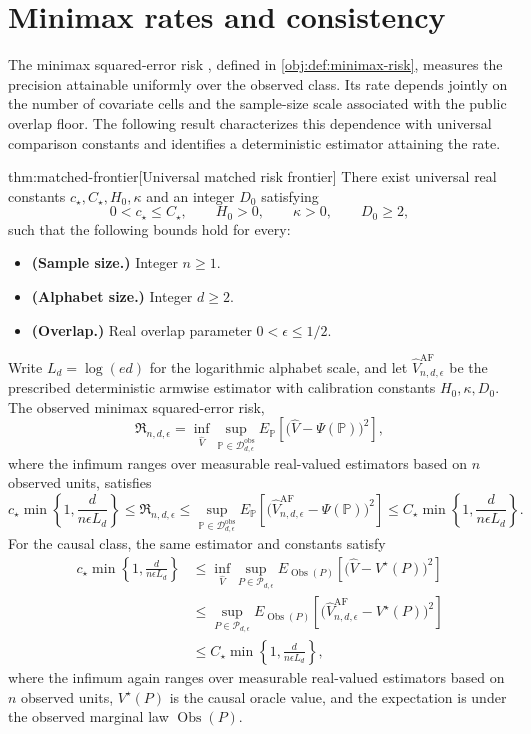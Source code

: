 \documentclass[11pt]{article}
\begin{document}
\section{Minimax rates and consistency}

The minimax squared-error risk , defined in \cref{obj:def:minimax-risk}, measures the precision attainable uniformly over the observed class. Its rate depends jointly on the number of covariate cells and the sample-size scale associated with the public overlap floor. The following result characterizes this dependence with universal comparison constants and identifies a deterministic estimator attaining the rate.

\begin{theoremv}{thm:matched-frontier}[Universal matched risk frontier]
There exist universal real constants \(c_\star,C_\star,H_0,\kappa\) and an integer \(D_0\) satisfying
\[
0<c_\star\le C_\star,\qquad H_0>0,\qquad \kappa>0,\qquad D_0\ge2,
\]
such that the following bounds hold for every:
\begin{itemize}
\item \textbf{(Sample size.)} Integer \(n\ge1\).
\item \textbf{(Alphabet size.)} Integer \(d\ge2\).
\item \textbf{(Overlap.)} Real overlap parameter \(0<\epsilon\le1/2\).
\end{itemize}
Write \(L_d=\log(ed)\) for the logarithmic alphabet scale, and let
\(\widehat V_{n,d,\epsilon}^{\mathrm{AF}}\) be the prescribed deterministic armwise estimator with calibration constants \(H_0,\kappa,D_0\). The observed minimax squared-error risk,
\[
\mathfrak R_{n,d,\epsilon}
=
\inf_{\widehat V}
\sup_{\mathbb P\in\mathcal D_{d,\epsilon}^{\mathrm{obs}}}
E_{\mathbb P}\!\left[
\bigl(\widehat V-\Psi(\mathbb P)\bigr)^2
\right],
\]
where the infimum ranges over measurable real-valued estimators based on \(n\) observed units, satisfies
\[
c_\star\min\left\{1,\frac{d}{n\epsilon L_d}\right\}
\le
\mathfrak R_{n,d,\epsilon}
\le
\sup_{\mathbb P\in\mathcal D_{d,\epsilon}^{\mathrm{obs}}}
E_{\mathbb P}\!\left[
\bigl(\widehat V_{n,d,\epsilon}^{\mathrm{AF}}-\Psi(\mathbb P)\bigr)^2
\right]
\le
C_\star\min\left\{1,\frac{d}{n\epsilon L_d}\right\}.
\]
For the causal class, the same estimator and constants satisfy
\[
\begin{aligned}
c_\star\min\left\{1,\frac{d}{n\epsilon L_d}\right\}
&\le
\inf_{\widehat V}
\sup_{P\in\mathcal P_{d,\epsilon}}
E_{\operatorname{Obs}(P)}\!\left[
\bigl(\widehat V-V^\star(P)\bigr)^2
\right]
\\
&\le
\sup_{P\in\mathcal P_{d,\epsilon}}
E_{\operatorname{Obs}(P)}\!\left[
\bigl(\widehat V_{n,d,\epsilon}^{\mathrm{AF}}-V^\star(P)\bigr)^2
\right]
\\
&\le
C_\star\min\left\{1,\frac{d}{n\epsilon L_d}\right\},
\end{aligned}
\]
where the infimum again ranges over measurable real-valued estimators based on \(n\) observed units, \(V^\star(P)\) is the causal oracle value, and the expectation is under the observed marginal law \(\operatorname{Obs}(P)\).
\end{theoremv}
\end{document}

